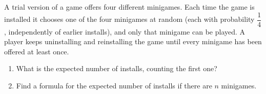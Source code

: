 A trial version of a game offers four different minigames. Each time the game is installed it chooses one of the four minigames at random (each with probability $\dfrac{1}{4}$, independently of earlier installs), and only that minigame can be played. A player keeps uninstalling and reinstalling the game until every minigame has been offered at least once.
\begin{enumerate}
\item[(a)] What is the expected number of installs, counting the first one?
\item[(b)] Find a formula for the expected number of installs if there are $n$ minigames.
\end{enumerate}
